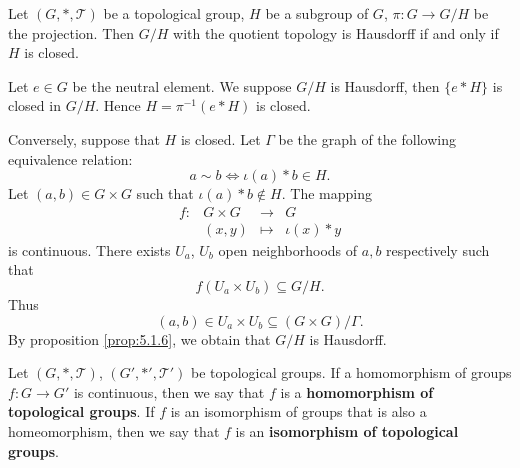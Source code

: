 \begin{propositionenv}
    Let $(G,*,\mathscr{T})$ be a topological group,
    $H$ be a subgroup of $G$,
    $\pi : G \rightarrow G/H$ be the projection.
    Then $G/H$ with the quotient topology is Hausdorff if and only if $H$ is closed.
\end{propositionenv}
\begin{proofenv}
    Let $e \in G$ be the neutral element.
    We suppose $G/H$ is Hausdorff,
    then $\{e * H\}$ is closed in $G/H$.
    Hence $H = \pi^{-1} (e * H)$ is closed.
    
    \quad Conversely, suppose that $H$ is closed.
    Let $\Gamma$ be the graph of the following equivalence relation:
    $$ a \sim b \Leftrightarrow \iota(a) * b \in H.$$
    Let $(a,b) \in G \times G$ such that $\iota(a) * b \notin H$.
    The mapping
    $$\begin{array}{rrcl}
        f : & G \times G & \longrightarrow & G\\
        & (x,y) & \longmapsto & \iota(x) * y
    \end{array}$$
    is continuous.
    There exists $U_a$, $U_b$ open neighborhoods of $a,b$ respectively such that
    $$ f (U_a \times U_b) \subseteq G/H.$$
    Thus
    $$ (a,b) \in U_a \times U_b \subseteq (G \times G)/\Gamma.$$
    By proposition \ref{prop:5.1.6}, we obtain that $G/H$ is Hausdorff.
\end{proofenv}

\begin{definitionenv}
    Let $(G,*,\mathscr{T})$, $(G',*',\mathscr{T}')$ be topological groups.
    If a homomorphism of groups $f : G \rightarrow G'$ is continuous,
    then we say that $f$ is a \textbf{homomorphism of topological groups}.
    If $f$ is an isomorphism of groups that is also a homeomorphism,
    then we say that $f$ is an \textbf{isomorphism of topological groups}.
\end{definitionenv}

